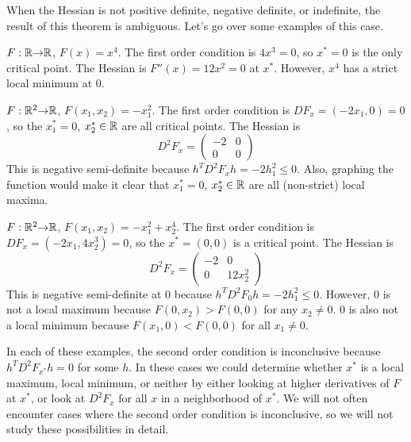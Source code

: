 When the Hessian is not positive definite, negative definite, or
indefinite, the result of this theorem is ambiguous. Let's go over
some examples of this case.
\begin{example}
  $F:\mathbb{R} {\rightarrow} \mathbb{R}$, $F(x) = x^4$. The first order condition is $4x^3 =
  0$, so $x^* = 0$ is the only critical point. The Hessian is $F''(x)
  = 12x^2 = 0$ at $x^*$. However, $x^4$ has a strict local minimum at
  $0$.
\end{example}

\begin{example}
  $F: \mathbb{R}^2 {\rightarrow} \mathbb{R}$, $F(x_1,x_2) = -x_1^2$. The first order condition is
  $DF_x = (-2x_1,0) = 0$, so the $x_1^*=0$, $x_2^* \in \mathbb{R}$ are all
  critical points. The Hessian is
  \[ D^2 F_x = \begin{pmatrix} -2 & 0 \\
    0 & 0 \end{pmatrix} \]
  This is negative semi-definite because $h^T D^2 F_x h = -2 h_1^2
  \leq 0$. Also, graphing the function would make it clear that
  $x_1^*=0$, $x_2^* \in \mathbb{R}$ are all (non-strict) local maxima. 
\end{example}

\begin{example}
  $F: \mathbb{R}^2 {\rightarrow} \mathbb{R}$, $F(x_1,x_2) = -x_1^2 + x_2^4$. The first order
  condition is $DF_x = (-2x_1,4 x_2^3) = 0$, so the $x^* = (0,0)$ is a
  critical point. The Hessian is  
  \[ D^2 F_x = \begin{pmatrix} -2 & 0 \\
    0 & 12 x_2^2 \end{pmatrix} \]
  This is negative semi-definite at $0$ because $h^T D^2 F_0 h = -2 h_1^2
  \leq 0$. However, $0$ is not a local maximum because $F(0,x_2)>
  F(0,0)$ for any $x_2 \neq 0$. $0$ is also not a local minimum
  because $F(x_1,0) < F(0,0)$ for all $x_1 \neq 0$.
\end{example}
In each of these examples, the second order condition is inconclusive
because $h^T D^2 F_{x^*} h = 0$ for some $h$. In these cases we could
determine whether $x^*$ is a local maximum, local minimum, or neither
by either looking at higher derivatives of $F$ at $x^*$, or look at
$D^2 F_{x}$ for all $x$ in a neighborhood of $x^*$. We will not often
encounter cases where the second order condition is inconclusive, so
we will not study these possibilities in detail.


